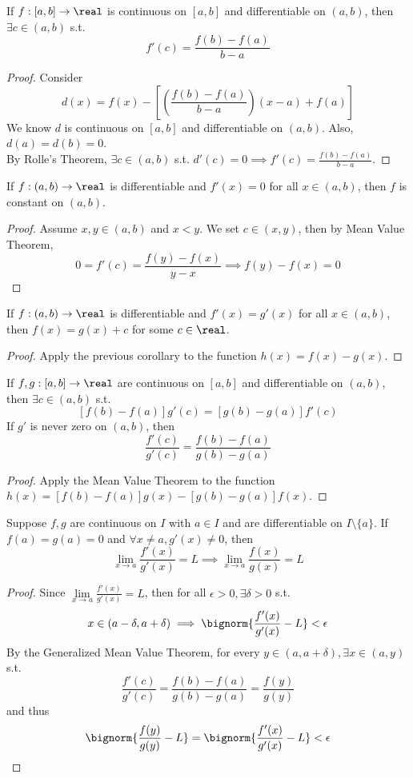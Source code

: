 \documentclass[11pt]{article}
\begin{document}
 If $f: [a,b] \rightarrow \real$ is continuous on $[a,b]$ and differentiable on $(a,b)$, then $\exists c \in (a,b)$ s.t.
$$f'(c) = \frac{f(b) - f(a)}{b-a}$$
\begin{proof}
	Consider 
	$$d(x) = f(x) - \left[ \left(\frac{f(b) - f(a)}{b-a}\right) (x-a) + f(a) \right]$$
	We know $d$ is continuous on $[a,b]$ and differentiable on $(a,b)$. Also, $d(a) = d(b) = 0$. \\
	By Rolle's Theorem, $\exists c \in (a,b)$ s.t. $d'(c) = 0 \implies f'(c) = \frac{f(b) - f(a)}{b-a}$.
\end{proof}

\corollary If $f: (a,b) \rightarrow \real$ is differentiable and $f'(x) = 0$ for all $x \in (a,b)$, then $f$ is constant on $(a,b)$.
\begin{proof}
	Assume $x, y \in (a,b)$ and $x < y$. We set $c \in (x,y)$, then by Mean Value Theorem,
	$$0 = f'(c) = \frac{f(y) - f(x)}{y-x} \implies f(y) - f(x) = 0$$
\end{proof}
	
\corollary If $f: (a,b) \rightarrow \real$ is differentiable and $f'(x) = g'(x)$ for all $x \in (a,b)$, then $f(x) = g(x) + c$ for some $c \in \real$.
\begin{proof}
	Apply the previous corollary to the function $h(x) = f(x) - g(x)$.
\end{proof}

 If $f, g: [a,b] \rightarrow \real$ are continuous on $[a,b]$ and differentiable on $(a,b)$, then $\exists c \in (a,b)$ s.t.
$$[f(b) - f(a)]g'(c) = [g(b) - g(a)]f'(c)$$
If $g'$ is never zero on $(a,b)$, then
$$\frac{f'(c)}{g'(c)} = \frac{f(b) - f(a)}{g(b) - g(a)}$$
\begin{proof}
	Apply the Mean Value Theorem to the function $h(x) = [f(b) - f(a)]g(x) - [g(b)-g(a)]f(x)$.
\end{proof}

 Suppose $f, g$ are continuous on $I$ with $a \in I$ and are differentiable on $I \setminus \{a\}$. If $f(a) = g(a) = 0$ and $\forall x \neq a, g'(x) \neq 0$, then
$$\underset{x \rightarrow a}{\lim} \frac{f'(x)}{g'(x)} = L \implies \underset{x \rightarrow a}{\lim}\frac{f(x)}{g(x)} = L$$
\begin{proof}
	Since $\underset{x \rightarrow a}{\lim}\frac{f'(x)}{g'(x)} = L$, then for all $\epsilon > 0, \exists \delta > 0$ s.t.
	$$x \in (a - \delta, a + \delta) \implies \bignorm{\frac{f'(x)}{g'(x)} - L} < \epsilon$$
	By the Generalized Mean Value Theorem, for every $y \in (a, a + \delta), \exists x \in (a, y)$ s.t.
	$$\frac{f'(c)}{g'(c)} = \frac{f(b) - f(a)}{g(b) - g(a)} = \frac{f(y)}{g(y)}$$
	and thus
	$$\bignorm{\frac{f(y)}{g(y)} - L} = \bignorm{\frac{f'(x)}{g'(x)} - L} < \epsilon$$
\end{proof}
\end{document}
